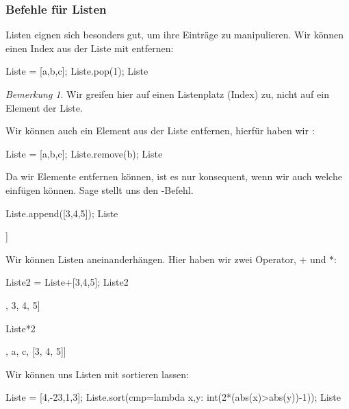 \documentclass[fontsize=12pt,paper=a4,twoside,bibtotoc,idxtotoc,
liststotoc,pagesize,BCOR1.2cm,DIV15,chapterprefix,pagesize=pdftex]{scrbook}
\theoremstyle{plain}
\theoremstyle{definition}
\theoremstyle{remark}
\newtheorem{bem}[equation]{Bemerkung}
\begin{document}
\subsubsection{Befehle für Listen}
Listen eignen sich besonders gut, um ihre Einträge zu manipulieren.
Wir können einen Index aus der Liste mit  entfernen:
\begin{sagein}
Liste = [a,b,c]; Liste.pop(1); Liste 
\end{sagein}
\begin{sage}
  [a, c]
\end{sage}
\begin{bem}
 Wir greifen hier auf einen Listenplatz (Index) zu, nicht auf ein Element der Liste.
\end{bem}
Wir können auch ein Element aus der Liste entfernen, hierfür haben wir :
\begin{sagein}
Liste = [a,b,c]; Liste.remove(b); Liste
\end{sagein}
\begin{sage}
  [a, c]
\end{sage}
Da wir Elemente entfernen können, ist es nur konsequent, wenn wir auch welche einfügen können. Sage stellt uns den -Befehl.
\begin{sagein}
Liste.append([3,4,5]); Liste
\end{sagein}
\begin{sage}
[a, c, [3, 4, 5]]
\end{sage}
Wir können Listen aneinanderhängen. Hier haben wir zwei Operator, $+$ und $*$:
\begin{sagein}
Liste2 = Liste+[3,4,5]; Liste2
\end{sagein}
\begin{sage}
[a, c, [3, 4, 5], 3, 4, 5]
\end{sage}
\begin{sagein}
Liste*2
\end{sagein}
\begin{sage}
 [a, c, [3, 4, 5], a, c, [3, 4, 5]]
\end{sage}
Wir können uns Listen mit  sortieren lassen:
\begin{sagein}
Liste = [4,-23,1,3]; Liste.sort(cmp=lambda x,y: int(2*(abs(x)>abs(y))-1)); Liste
\end{sagein}
\begin{sage}
[1, 3, 4, -23]
\end{sage}
\end{document}
